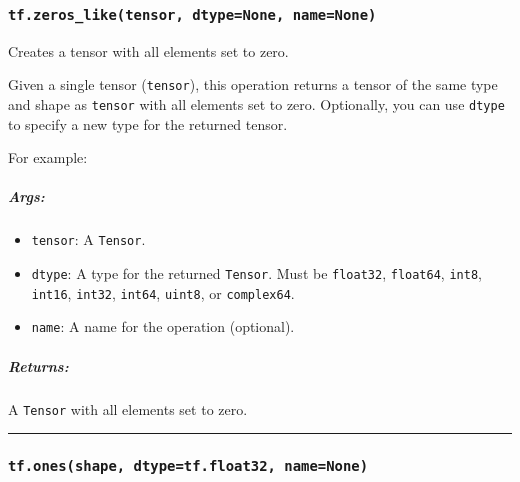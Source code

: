 \subsubsection{\texorpdfstring{\texttt{tf.zeros\_like(tensor,\ dtype=None,\ name=None)}
}{tf.zeros\_like(tensor, dtype=None, name=None) }}\label{tf.zerosux5fliketensor-dtypenone-namenone}

Creates a tensor with all elements set to zero.

Given a single tensor (\texttt{tensor}), this operation returns a tensor
of the same type and shape as \texttt{tensor} with all elements set to
zero. Optionally, you can use \texttt{dtype} to specify a new type for
the returned tensor.

For example:

\begin{Shaded}
\begin{Highlighting}[]
\OperatorTok{==>} \NormalTok{[[}\NormalTok{, }\NormalTok{, }\NormalTok{], [}\NormalTok{, }\NormalTok{, }\NormalTok{]]}
\end{Highlighting}
\end{Shaded}

\subparagraph{Args: }\label{args-1}

\begin{itemize}
\item
  \texttt{tensor}: A \texttt{Tensor}.
\item
  \texttt{dtype}: A type for the returned \texttt{Tensor}. Must be
  \texttt{float32}, \texttt{float64}, \texttt{int8}, \texttt{int16},
  \texttt{int32}, \texttt{int64}, \texttt{uint8}, or \texttt{complex64}.
\item
  \texttt{name}: A name for the operation (optional).
\end{itemize}

\subparagraph{Returns: }\label{returns-1}

A \texttt{Tensor} with all elements set to zero.

\begin{center}\rule{0.5\linewidth}{\linethickness}\end{center}

\subsubsection{\texorpdfstring{\texttt{tf.ones(shape,\ dtype=tf.float32,\ name=None)}
}{tf.ones(shape, dtype=tf.float32, name=None) }}\label{tf.onesshape-dtypetf.float32-namenone}

